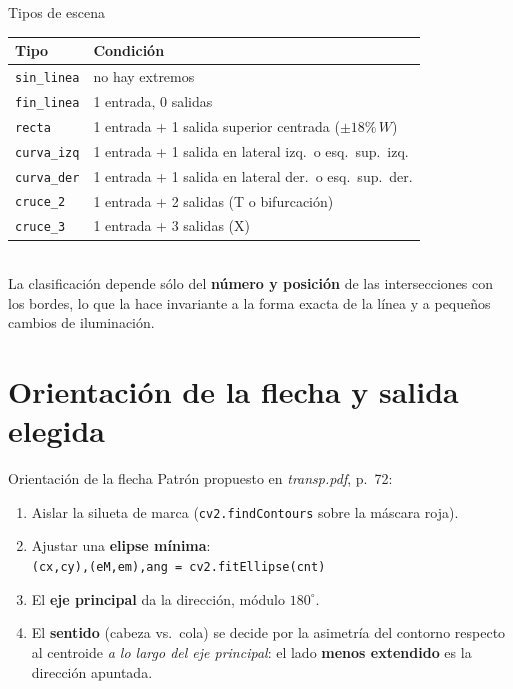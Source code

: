 \begin{frame}{Tipos de escena}
\small
\begin{tabular}{ll}
\hline
\textbf{Tipo}            & \textbf{Condición}\\\hline
\texttt{sin\_linea}      & no hay extremos\\
\texttt{fin\_linea}      & 1 entrada, 0 salidas\\
\texttt{recta}           & 1 entrada + 1 salida superior centrada ($\pm 18\%\,W$)\\
\texttt{curva\_izq}      & 1 entrada + 1 salida en lateral izq.\ o esq.\ sup.\ izq.\\
\texttt{curva\_der}      & 1 entrada + 1 salida en lateral der.\ o esq.\ sup.\ der.\\
\texttt{cruce\_2}        & 1 entrada + 2 salidas (T o bifurcación)\\
\texttt{cruce\_3}        & 1 entrada + 3 salidas (X)\\\hline
\end{tabular}
\\[2mm]
La clasificación depende sólo del \textbf{número y posición} de las intersecciones con los bordes, lo que la hace invariante a la forma exacta de la línea y a pequeños cambios de iluminación.
\end{frame}


\section{Orientación de la flecha y salida elegida}

\begin{frame}{Orientación de la flecha}
Patrón propuesto en \emph{transp.pdf}, p.~72:
\begin{enumerate}
  \item Aislar la silueta de marca (\texttt{cv2.findContours} sobre la máscara roja).
  \item Ajustar una \textbf{elipse mínima}:\\
        \texttt{(cx,cy),(eM,em),ang = cv2.fitEllipse(cnt)}
  \item El \textbf{eje principal} da la dirección, módulo $180^{\circ}$.
  \item El \textbf{sentido} (cabeza vs.\ cola) se decide por la asimetría del contorno respecto al centroide \emph{a lo largo del eje principal}: el lado \textbf{menos extendido} es la dirección apuntada.
\end{enumerate}
\end{frame}

